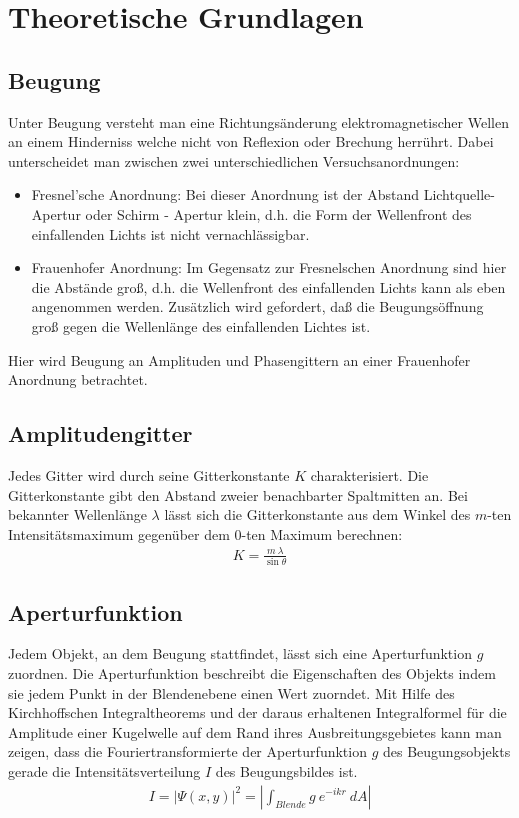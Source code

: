 \documentclass[12pt]{article}
\begin{document}
\newpage

\section{Theoretische Grundlagen}

\subsection{Beugung}
Unter Beugung versteht man eine Richtungsänderung elektromagnetischer Wellen an einem Hinderniss welche nicht von Reflexion oder Brechung herrührt. Dabei unterscheidet man zwischen zwei unterschiedlichen Versuchsanordnungen:
\begin{itemize}
 \item Fresnel’sche Anordnung: Bei dieser Anordnung ist der Abstand Lichtquelle-Apertur oder Schirm - Apertur klein, d.h. die Form der Wellenfront des einfallenden Lichts ist nicht vernachlässigbar.
 \item Frauenhofer Anordnung: Im Gegensatz zur Fresnelschen Anordnung sind hier die Abstände groß, d.h. die Wellenfront des einfallenden Lichts kann als eben angenommen werden. Zusätzlich wird gefordert, daß die Beugungsöffnung groß gegen die Wellenlänge des einfallenden Lichtes ist.
\end{itemize}
Hier wird Beugung an Amplituden und Phasengittern an einer Frauenhofer Anordnung betrachtet.

\subsection{Amplitudengitter}
Jedes Gitter wird durch seine Gitterkonstante $K$ charakterisiert. Die Gitterkonstante gibt den Abstand zweier benachbarter Spaltmitten an.
Bei bekannter Wellenlänge $\lambda$ lässt sich die Gitterkonstante aus dem Winkel des $m$-ten Intensitätsmaximum gegenüber dem 0-ten Maximum berechnen:
\begin{align}
\label{gitterkonstante} K = \frac{m \ \lambda}{\sin{\theta}}
\end{align}

\subsection{Aperturfunktion}
Jedem Objekt, an dem Beugung stattfindet, lässt sich eine Aperturfunktion $g$ zuordnen. Die Aperturfunktion beschreibt die Eigenschaften des Objekts indem
sie jedem Punkt in der Blendenebene einen Wert zuorndet. Mit Hilfe des Kirchhoffschen Integraltheorems und der daraus erhaltenen Integralformel für die
Amplitude einer Kugelwelle auf dem Rand ihres Ausbreitungsgebietes kann man zeigen, dass die Fouriertransformierte der Aperturfunktion $g$ des
Beugungsobjekts gerade die Intensitätsverteilung $I$ des Beugungsbildes ist.
\begin{align}
 I = \lvert \Psi(x,y) \rvert^2 = \left\lvert \int_{Blende}{g \ e^{-ikr} \ dA} \right\rvert
\end{align}
\end{document}
